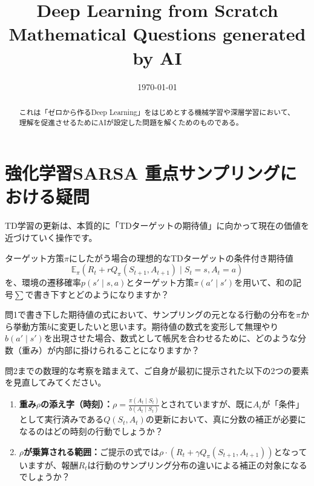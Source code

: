 \documentclass[fontsize=10.5pt]{jlreq}
\title{Deep Learning from Scratch Mathematical Questions generated by AI}
\author{}
\date{\today}
\begin{document}
\maketitle
\begin{abstract}
  これは「ゼロから作るDeep Learning」をはじめとする機械学習や深層学習において、理解を促進させるためにAIが設定した問題を解くためのものである。
\end{abstract}

\section{強化学習SARSA 重点サンプリングにおける疑問}

\begin{question}[TDターゲットの期待値の定義]
  TD学習の更新は、本質的に「TDターゲットの期待値」に向かって現在の価値を近づけていく操作です。

  ターゲット方策$\pi$にしたがう場合の理想的なTDターゲットの条件付き期待値
  \begin{equation*}
    \mathbb{E}_\pi\left(R_t + rQ_\pi(S_{t+1}, A_{t+1}) \mid S_t = s, A_t = a\right)
  \end{equation*}
  を、環境の遷移確率$p(s' \mid s, a)$とターゲット方策$\pi(a' \mid s')$を用いて、和の記号$\sum$で書き下すとどのようになりますか？
\end{question}

\newpage

\begin{question}
  問1で書き下した期待値の式において、サンプリングの元となる行動の分布を$\pi$から挙動方策$b$に変更したいと思います。期待値の数式を変形して無理やり$b(a' \mid s')$を出現させた場合、数式として帳尻を合わせるために、どのような分数（重み）が内部に掛けられることになりますか？
\end{question}

\newpage

\begin{question}[ご提示いただいた式の検証]
  問2までの数理的な考察を踏まえて、ご自身が最初に提示された以下の2つの要素を見直してみてください。
  \begin{enumerate}
    \item \textbf{重み$\rho$の添え字（時刻）：}$\displaystyle \rho = \frac{\pi(A_t \mid S_t)}{b(A_t \mid S_t)}$とされていますが、既に$A_t$が「条件」として実行済みである$Q(S_t, A_t)$の更新において、真に分数の補正が必要になるのはどの時刻の行動でしょうか？
    \item \textbf{$\rho$が乗算される範囲：}ご提示の式では$\rho \cdot \left(R_t + \gamma Q_\pi(S_{t+1}, A_{t+1})\right)$となっていますが、報酬$R_t$は行動のサンプリング分布の違いによる補正の対象になるでしょうか？
  \end{enumerate}
\end{question}
\end{document}
